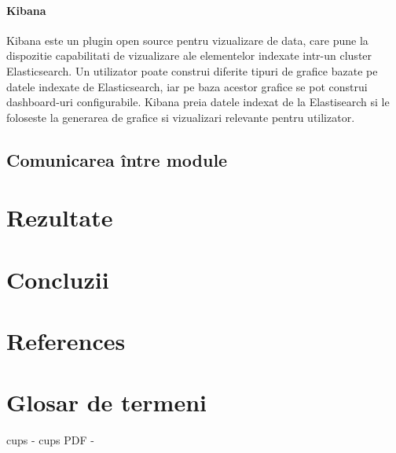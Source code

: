 \documentclass[12pt]{report}
\begin{document}
			\subsubsection{Kibana}
Kibana este un plugin open source pentru vizualizare de data, care pune la dispozitie capabilitati de vizualizare ale elementelor indexate intr-un cluster Elasticsearch. Un utilizator poate  construi diferite tipuri de grafice bazate pe datele indexate de Elasticsearch, iar pe baza acestor grafice se pot construi dashboard-uri configurabile. Kibana preia datele indexat de la Elastisearch si le foloseste la generarea de grafice si vizualizari relevante pentru utilizator.


	\section{Comunicarea între module}

\chapter{Rezultate}

\chapter{Concluzii}

\chapter{References}

\chapter{Glosar de termeni}
\acrshort{cups} - \acrlong{cups}
PDF - 

\clearpage

\printglossaries
\end{document}
